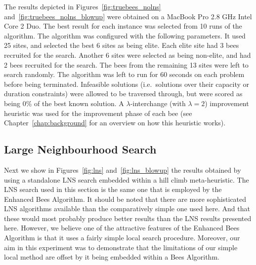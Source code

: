 The results depicted in Figures~\ref{fig:truebees_nolns} and~\ref{fig:truebees_nolns_blowup} were obtained on a MacBook Pro 2.8 GHz Intel Core 2 Duo. The best result for each instance was selected from 10 runs of the algorithm. The algorithm was configured with the following parameters. It used 25 sites, and selected the best 6 sites as being elite. Each elite site had 3 bees recruited for the search. Another 6 sites were selected as being non-elite, and had 2 bees recruited for the search. The bees from the remaining 13 sites were left to search randomly. The algorithm was left to run for 60 seconds on each problem before being terminated. Infeasible solutions (i.e.~solutions over their capacity or duration constraints) were allowed to be traversed through, but were scored as being 0\% of the best known solution. A $\lambda$-interchange (with $\lambda = 2$) improvement heuristic was used for the improvement phase of each bee (see Chapter~\ref{chap:background} for an overview on how this heuristic works).

\subsection{Large Neighbourhood Search}
\label{subsec:largeneighbourhoodsearch}

Next we show in Figures~\ref{fig:lns} and~\ref{fig:lns_blowup} the results obtained by using a standalone LNS search embedded within a hill climb meta-heuristic. The LNS search used in this section is the same one that is employed by the Enhanced Bees Algorithm. It should be noted that there are more sophisticated LNS algorithms available than the comparatively simple one used here. And that these would most probably produce better results than the LNS results presented here. However, we believe one of the attractive features of the Enhanced Bees Algorithm is that it uses a fairly simple local search procedure. Moreover, our aim in this experiment was to demonstrate that the limitations of our simple local method are offset by it being embedded within a Bees Algorithm.


